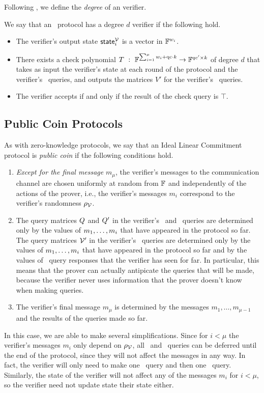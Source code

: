 Following , we define the \emph{degree} of an \ILC verifier.

\begin{definition}
We say that an \ILC\ protocol has a degree $d$ verifier if the following hold.
\begin{itemize}
\item The verifier's output state $\mathsf{state}_i^{\mathcal{V}}$ is a vector in $\mathbb{F}^{w_i}$.
\item There exists a check polynomial $T \ : \ \mathbb{F}^{\sum_{i=1}^\mu w_i + \mathrm{qc} \cdot k} \to \mathbb{F}^{qc' \times k}$ of degree $d$ that takes as input the verifier's state at each round of the protocol and the verifier's \ILCopen\ queries, and outputs the matrices $V'$ for the verifier's \ILCcheck\ queries.
\item The verifier accepts if and only if the result of the check query is $\top$.
\end{itemize}
\end{definition}

\subsection{Public Coin Protocols}

As with zero-knowledge protocols, we say that an Ideal Linear Commitment protocol is \emph{public coin} if the following conditions hold.
\begin{enumerate}
\item \emph{Except for the final message} $m_\mu$, the verifier's messages to the communication channel are chosen uniformly at random from $\mathbb{F}$ and independently of the actions of the prover, i.e., the verifier's messages $m_i$ correspond to the verifier's randomness $\rho_{\mathcal{V}}$.
\item The query matrices $Q$ and $Q'$ in the verifier's \ILCopen\ and \ILCcheck\ queries are determined only by the values of $m_1,\ldots,m_i$ that have appeared in the protocol so far. The query matrices $\mathcal{V}'$ in the verifier's \ILCcheck\ queries are determined only by the values of $m_1,\ldots,m_i$ that have appeared in the protocol so far and by the values of \ILCopen\ query responses that the verifier has seen for far. In particular, this means that the prover can actually antipicate the queries that will be made, because the verifier never uses information that the prover doesn't know when making queries.
\item The verifier's final message $m_\mu$ is determined by the messages $m_1,\ldots,m_{\mu-1}$ and the results of the queries made so far.
\end{enumerate}
%
In this case, we are able to make several simplifications. Since for $i < \mu$ the verifier's messages $m_i$ only depend on $\rho_{\mathcal{V}}$, all \ILCopen\ and \ILCcheck\ queries can be deferred until the end of the protocol, since they will not affect the messages in any way. In fact, the verifier will only need to make one \ILCopen\ query and then one \ILCcheck\ query. Similarly, the state of the verifier will not affect any of the messages $m_i$ for $i < \mu$, so the verifier need not update state their state either.

